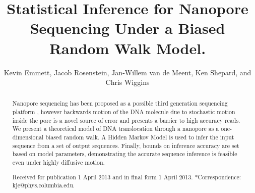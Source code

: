 \documentclass{biophys_letter}
\begin{document}
\setcounter{page}{1} %
\title{Statistical Inference for Nanopore Sequencing Under a Biased Random Walk Model.}

\author{Kevin Emmett,{\authdagger} Jacob Rosenstein, Jan-Willem van de Meent, Ken Shepard, and Chris Wiggins}

\address{{\addrdagger}Department of Physics and Department of Applied Physics and Applied Math, Columbia University, New York, New York; and School of Engineering, Brown University, Providence, Rhode Island}

\maketitle

\pagestyle{headings}



\begin{abstract}
{Nanopore sequencing has been proposed as a possible third generation sequencing platform 
,
however 
backwards motion of the DNA molecule due to stochastic motion 
inside the pore is a novel source of error 
and presents a barrier to high accuracy reads.
We present a theoretical model
 of DNA translocation through a nanopore as a one-dimensional biased random walk.
A Hidden Markov Model is used to infer the input sequence from a set of output sequences.
Finally, bounds on inference accuracy are set based on model parameters, demonstrating the accurate sequence inference is feasible even under highly diffusive motion.

}
{Received for publication 1 April 2013 and in final form 1 April 2013.}
{*Correspondence: kje@phys.columbia.edu.}
\end{abstract}
\end{document}

